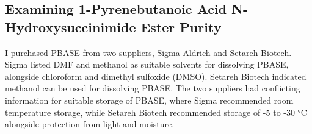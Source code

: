 \documentclass[
  a4paper,
]{scrbook}
\begin{document}
\hypertarget{sec-PBASE-purity}{%
\subsection{Examining 1-Pyrenebutanoic Acid N-Hydroxysuccinimide Ester
Purity}\label{sec-PBASE-purity}}

I purchased PBASE from two suppliers, Sigma-Aldrich and Setareh Biotech.
Sigma listed DMF and methanol as suitable solvents for dissolving PBASE,
alongside chloroform and dimethyl sulfoxide (DMSO). Setareh Biotech
indicated methanol can be used for dissolving PBASE. The two suppliers
had conflicting information for suitable storage of PBASE, where Sigma
recommended room temperature storage, while Setareh Biotech recommended
storage of -5 to -30 °C alongside protection from light and moisture.
\end{document}
